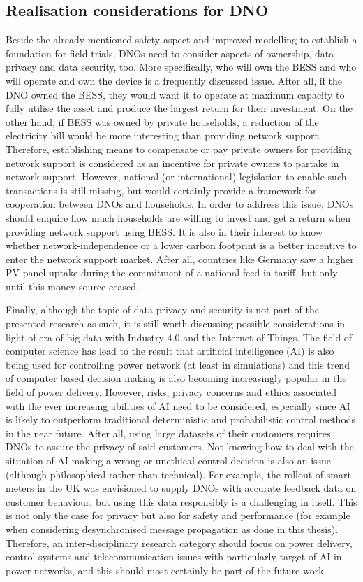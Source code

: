 \subsection{Realisation considerations for DNO}

Beside the already mentioned safety aspect and improved modelling to establish a foundation for field trials, DNOs need to consider aspects of ownership, data privacy and data security, too.
More specifically, who will own the BESS and who will operate and own the device is a frequently discussed issue.
After all, if the DNO owned the BESS, they would want it to operate at maximum capacity to fully utilise the asset and produce the largest return for their investment.
On the other hand, if BESS was owned by private households, a reduction of the electricity bill would be more interesting than providing network support.
Therefore, establishing means to compensate or pay private owners for providing network support is considered as an incentive for private owners to partake in network support.
However, national (or international) legislation to enable such transactions is still missing, but would certainly provide a framework for cooperation between DNOs and households.
In order to address this issue, DNOs should enquire how much households are willing to invest and get a return when providing network support using BESS.
It is also in their interest to know whether network-independence or a lower carbon footprint is a better incentive to enter the network support market.
After all, countries like Germany saw a higher PV panel uptake during the commitment of a national feed-in tariff, but only until this money source ceased.

Finally, although the topic of data privacy and security is not part of the presented research as such, it is still worth discussing possible considerations in light of era of big data with Industry 4.0 and the Internet of Things.
The field of computer science has lead to the result that artificial intelligence (AI) is also being used for controlling power network (at least in simulations) and this trend of computer based decision making is also becoming increasingly popular in the field of power delivery.
However, risks, privacy concerns and ethics associated with the ever increasing abilities of AI need to be considered, especially since AI is likely to outperform traditional deterministic and probabilistic control methods in the near future.
After all, using large datasets of their customers requires DNOs to assure the privacy of said customers.
Not knowing how to deal with the situation of AI making a wrong or unethical control decision is also an issue (although philosophical rather than technical).
For example, the rollout of smart-meters in the UK was envisioned to supply DNOs with accurate feedback data on customer behaviour, but using this data responsibly is a challenging in itself.
This is not only the case for privacy but also for safety and performance (for example when considering desynchronised message propagation as done in this thesis).
Therefore, an inter-disciplinary research category should focus on power delivery, control systems and telecommunication issues with particularly target of AI in power networks, and this should most certainly be part of the future work.
